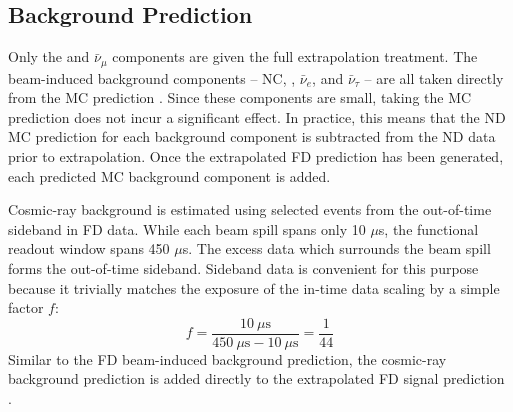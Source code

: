 \subsection{Background Prediction}

Only the \numu and $\bar{\nu}_\mu$ components are given the full extrapolation
treatment.
The beam-induced background components -- NC, \nue, $\bar{\nu}_e$, \nutau and
$\bar{\nu}_\tau$ -- are all taken directly from the MC prediction
\cite{lozier2015extrap}.
Since these components are small, taking the MC prediction does not incur
a significant effect.
In practice, this means that the ND MC prediction for each background component
is subtracted from the ND data prior to extrapolation.
Once the extrapolated FD prediction has been generated, each predicted MC
background component is added.


Cosmic-ray background is estimated using selected events from the out-of-time
sideband in FD data.
While each \numi beam spill spans only 10 $\mu$s, the functional readout window
spans 450 $\mu$s.
The excess data which surrounds the beam spill forms the out-of-time sideband.
Sideband data is convenient for this purpose because it trivially
matches the exposure of the in-time data scaling by a simple factor $f$:
\begin{equation}
f = \frac{10~\mu\text{s}}{ 450~\mu\text{s} - 10~\mu\text{s}} = \frac{1}{44}
\end{equation}
Similar to the FD beam-induced background prediction, the cosmic-ray
background prediction is added directly to the extrapolated FD signal
prediction \cite{backhouse2015cafana}.


